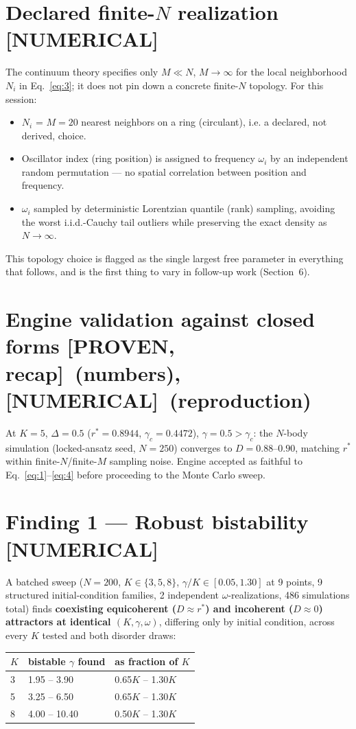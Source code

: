 \documentclass[11pt]{article}
\newcommand{\PROVEN}{\textbf{\textcolor{green!40!black}{[PROVEN, recap]}}}
\newcommand{\NUM}{\textbf{\textcolor{blue!60!black}{[NUMERICAL]}}}
\begin{document}
\section{Declared finite-$N$ realization \NUM}
The continuum theory specifies only $M\ll N$, $M\to\infty$ for the local neighborhood $N_i$ in Eq.~\eqref{eq:3}; it does not pin down a concrete finite-$N$ topology. For this session:
\begin{itemize}
\item $N_i$ = $M=20$ nearest neighbors on a ring (circulant), i.e. a declared, not derived, choice.
\item Oscillator index (ring position) is assigned to frequency $\omega_i$ by an independent random permutation --- no spatial correlation between position and frequency.
\item $\omega_i$ sampled by deterministic Lorentzian quantile (rank) sampling, avoiding the worst i.i.d.-Cauchy tail outliers while preserving the exact density as $N\to\infty$.
\end{itemize}
This topology choice is flagged as the single largest free parameter in everything that follows, and is the first thing to vary in follow-up work (Section~6).

\section{Engine validation against closed forms \PROVEN\ (numbers), \NUM\ (reproduction)}
At $K=5$, $\Delta=0.5$ ($r^\ast=0.8944$, $\gamma_c=0.4472$), $\gamma=0.5>\gamma_c$: the $N$-body simulation (locked-ansatz seed, $N=250$) converges to $D=0.88$--$0.90$, matching $r^\ast$ within finite-$N$/finite-$M$ sampling noise. Engine accepted as faithful to Eq.~\eqref{eq:1}--\eqref{eq:4} before proceeding to the Monte Carlo sweep.

\section{Finding 1 --- Robust bistability \NUM}
A batched sweep ($N=200$, $K\in\{3,5,8\}$, $\gamma/K\in[0.05,1.30]$ at 9 points, 9 structured initial-condition families, 2 independent $\omega$-realizations, 486 simulations total) finds \textbf{coexisting equicoherent ($D\approx r^\ast$) and incoherent ($D\approx 0$) attractors at identical $(K,\gamma,\omega)$}, differing only by initial condition, across every $K$ tested and both disorder draws:

\begin{center}
\begin{tabular}{@{}lll@{}}
\toprule
$K$ & bistable $\gamma$ found & as fraction of $K$ \\
\midrule
3 & 1.95 -- 3.90 & 0.65$K$ -- 1.30$K$ \\
5 & 3.25 -- 6.50 & 0.65$K$ -- 1.30$K$ \\
8 & 4.00 -- 10.40 & 0.50$K$ -- 1.30$K$ \\
\bottomrule
\end{tabular}
\end{center}
\end{document}
